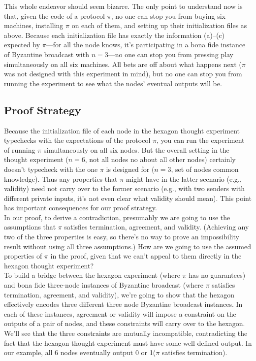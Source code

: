 This whole endeavor should seem bizarre. The only point to understand now is that, given
the code of a protocol $\pi$, no one can stop you from buying six machines, installing $\pi$ on each
of them, and setting up their initialization files as above. Because each initialization file has
exactly the information (a)–(c) expected by $\pi$—for all the node knows, it’s participating in
a bona fide instance of Byzantine broadcast with $n = 3$—no one can stop you from pressing
play simultaneously on all six machines. All bets are off about what happens next ($\pi$ was
not designed with this experiment in mind), but no one can stop you from running the
experiment to see what the nodes’ eventual outputs will be.

\subsection{Proof Strategy}
Because the initialization file of each node in the hexagon thought experiment typechecks with the expectations of the protocol $\pi$, you can run the experiment of running $\pi$ simultaneously on all six nodes. But the overall setting in the thought experiment
($n = 6$, not all nodes no about all other nodes) certainly doesn't typecheck with the one $\pi$ is designed
for ($n = 3$, set of nodes common knowledge). Thus any properties that $\pi$ might have in
the latter scenario (e.g., validity) need not carry over to the former scenario (e.g., with two
senders with different private inputs, it’s not even clear what validity should mean). This
point has important consequences for our proof strategy.\\
In our proof, to derive a contradiction, presumably we are going to use the assumptions that $\pi$ satisfies termination, agreement, and validity. (Achieving any two of the three
properties is easy, so there’s no way to prove an impossibility result without using all three
assumptions.) How are we going to use the assumed properties of $\pi$ in the proof, given that
we can’t appeal to them directly in the hexagon thought experiment?\\
To build a bridge between the hexagon experiment (where $\pi$ has no guarantees) and bona fide three-node instances of Byzantine broadcast (where $\pi$ satisfies termination, agreement,
and validity), we’re going to show that the hexagon effectively encodes three different three node Byzantine broadcast instances. In each of these instances, agreement or validity will impose a constraint on the outputs of a pair of nodes, and these constraints will carry over to
the hexagon. We’ll see that the three constraints are mutually incompatible, contradicting
the fact that the hexagon thought experiment must have some well-defined output. In our example, all 6 nodes eventually output 0 or 1($\pi$ satisfies termination).

